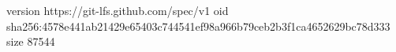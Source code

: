 version https://git-lfs.github.com/spec/v1
oid sha256:4578e441ab21429e65403c744541ef98a966b79ceb2b3f1ca4652629bc78d333
size 87544
